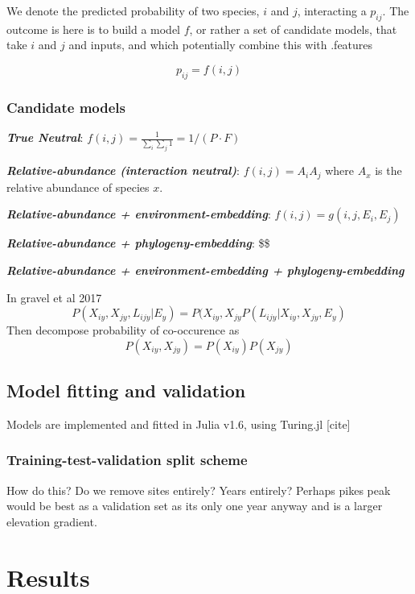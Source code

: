 \documentclass[10pt,oneside]{article}
\begin{document}
We denote the predicted probability of two species, \(i\) and \(j\),
interacting a \(p_{ij}\). The outcome is here is to build a model \(f\),
or rather a set of candidate models, that take \(i\) and \(j\) and
inputs, and which potentially combine this with .features

\[p_{ij} = f(i,j)\]

\hypertarget{candidate-models}{%
\subsubsection{Candidate models}\label{candidate-models}}

\textbf{\emph{True Neutral}}:
\(f(i,j) = \frac{1}{\sum_i \sum_j 1} = 1 / (P\cdot F)\)

\textbf{\emph{Relative-abundance (interaction neutral)}}:
\(f(i,j) = A_i A_j\) where \(A_x\) is the relative abundance of species
\(x\).

\textbf{\emph{Relative-abundance + environment-embedding}}:
\(f(i,j) = g(i,j, E_i, E_j)\)

\textbf{\emph{Relative-abundance + phylogeny-embedding}}: \$\$

\textbf{\emph{Relative-abundance + environment-embedding +
phylogeny-embedding}}

In gravel et al 2017
\[P(X_{iy}, X_{jy}, L_{ijy} | E_y) = P(X_{iy},X_{jy}P(L_{ijy} | X_{iy}, X_{jy}, E_y)\]
Then decompose probability of co-occurence as
\[P(X_{iy}, X_{jy}) = P(X_{iy})P(X_{jy})\]

\hypertarget{model-fitting-and-validation}{%
\subsection{Model fitting and
validation}\label{model-fitting-and-validation}}

Models are implemented and fitted in Julia v1.6, using Turing.jl
{[}cite{]}

\hypertarget{training-test-validation-split-scheme}{%
\subsubsection{Training-test-validation split
scheme}\label{training-test-validation-split-scheme}}

How do this? Do we remove sites entirely? Years entirely? Perhaps pikes
peak would be best as a validation set as its only one year anyway and
is a larger elevation gradient.

\hypertarget{results}{%
\section{Results}\label{results}}
\end{document}
